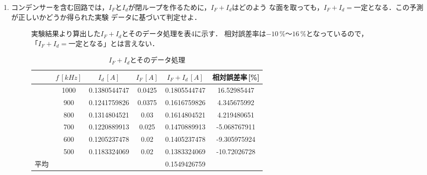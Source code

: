 \begin{enumerate}
    \item コンデンサーを含む回路では，$I_F$と$I_d$が閉ループを作るために，$I_F+I_d$はどのよう
    な面を取っても，$I_F+I_d=一定$となる．この予測が正しいかどうか得られた実験
    データに基づいて判定せよ．
    \begin{description}
        \item[] 実験結果より算出した$I_F+I_d$とそのデータ処理を表4に示す．
        相対誤差率は$-10\,\%～16\,\%$となっているので，$「I_F+I_d=一定となる」$とは言えない．
        \begin{table}[H]
            \centering
            \caption{$I_F+I_d$とそのデータ処理}
            \begin{tabular}{c|c|ccc|c}
                \hline
                ~ & $f\,[\si{kHz}]$ & $I_d\,[\si{A}]$ & $I_F\,[\si{A}]$ & $I_F+I_d\,[\si{A}]$ & 相対誤差率\,[\%] \\ \hline
                ~ & 1000 & 0.1380544747 & 0.0425 & 0.1805544747 & 16.52985447 \\ 
                ~ & 900 & 0.1241759826 & 0.0375 & 0.1616759826 & 4.345675992 \\ 
                ~ & 800 & 0.1314804521 & 0.03 & 0.1614804521 & 4.219480651 \\ 
                ~ & 700 & 0.1220889913 & 0.025 & 0.1470889913 & -5.068767911 \\ 
                ~ & 600 & 0.1205237478 & 0.02 & 0.1405237478 & -9.305975924 \\ 
                ~ & 500 & 0.1183324069 & 0.02 & 0.1383324069 & -10.72026728 \\ \hline
                平均 & ~ & ~ & ~ & 0.1549426759 \\ \hline
            \end{tabular}
        \end{table}
    \end{description}
    
\end{enumerate}